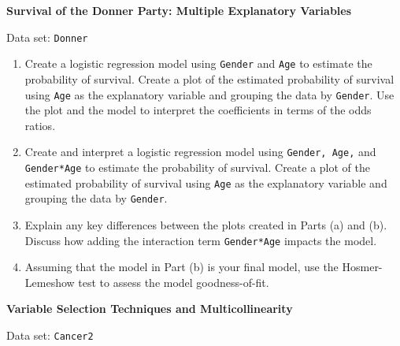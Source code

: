 \documentclass[
]{report}
\begin{document}
\begin{list}{E..}{ \setlength{\itemsep}{1.2em}}
  \item \textbf{Survival of the Donner Party: Multiple Explanatory Variables}

Data set: \texttt{Donner}

  \begin{enumerate}
    \item Create a logistic regression model using \texttt{Gender} and \texttt{Age} to estimate the probability of survival. Create a plot of the estimated probability of survival using \texttt{Age} as the explanatory variable and grouping the data by \texttt{Gender}. Use the plot and the model to interpret the coefficients in terms of the odds ratios.
    \item Create and interpret a logistic regression model using \texttt{Gender, Age,} and \texttt{Gender*Age} to estimate the probability of survival. Create a plot of the estimated probability of survival using \texttt{Age} as the explanatory variable and grouping the data by \texttt{Gender}.
    \item Explain any key differences between the plots created in Parts (a) and (b). Discuss how adding the interaction term \texttt{Gender*Age} impacts the model.
    \item Assuming that the model in Part (b) is your final model, use the Hosmer-Lemeshow test to assess the model goodness-of-fit.
  \end{enumerate}

  \item \textbf{Variable Selection Techniques and Multicollinearity}

Data set: \texttt{Cancer2}


\end{list}
\end{document}
